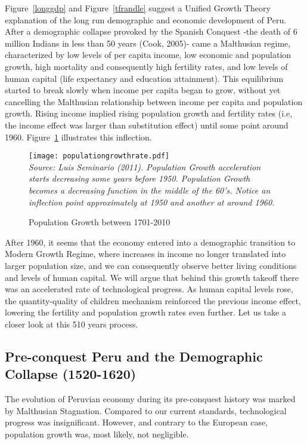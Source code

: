 \documentclass[12pt]{article}%
\begin{document}
Figure~\ref{longgdp} and Figure~\ref{tfrandle} suggest a Unified Growth Theory explanation of the long run demographic and economic development of Peru. After a demographic collapse provoked by the Spanish Conquest -the death of 6 million Indians in less than 50 years (Cook, 2005)- came a Malthusian regime, characterized by low levels of per capita income, low economic and population growth, high mortality and consequently high fertility rates, and low levels of human capital (life expectancy and education attainment). This equilibrium started to break slowly when income per capita began to grow, without yet cancelling the Malthusian relationship between income per capita and population growth. Rising income implied rising population growth and fertility rates (i.e, the income effect was larger than substitution effect) until some point around 1960. Figure~\ref{a} illustrates this inflection.
\begin{figure}[h]
\caption{Population Growth between 1701-2010}
\centering
\texttt{[image: populationgrowthrate.pdf]} \\
\footnotesize
\textit{Source: Luis Seminario (2011). Population Growth acceleration starts decreasing some years before 1950. Population Growth becomes a decreasing function in the middle of the 60's. Notice an inflection point approximately at 1950 and another at around 1960.}
\label{a}
\end{figure}
After 1960, it seems that the economy entered into a demographic transition to Modern Growth Regime, where increases in income no longer translated into larger population size, and we can consequently observe better living conditions and levels of human capital. We will argue that behind this growth takeoff there was an accelerated rate of technological progress.  As human capital levels rose, the quantity-quality of children mechanism reinforced the previous income effect, lowering the fertility and population growth rates even further. Let us take a closer look at this 510 years process.
\subsection{Pre-conquest Peru and the Demographic Collapse (1520-1620)}
The evolution of Peruvian economy during its pre-conquest history was marked by Malthusian Stagnation. Compared to our current standards, technological progress was insignificant. However, and contrary to the European case, population growth was, most likely, not negligible.
\end{document}
